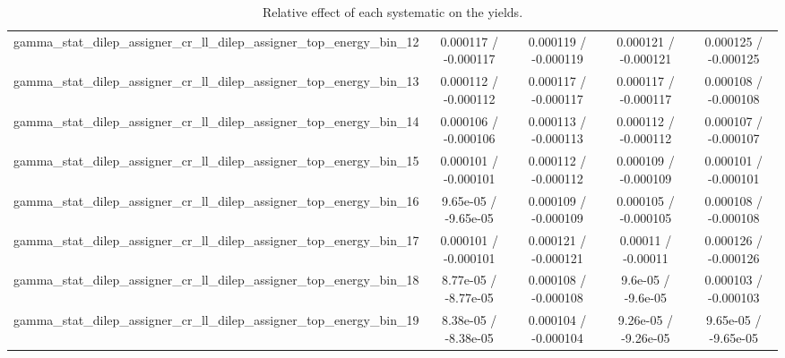 \documentclass[10pt]{article}
\begin{document}
\begin{table}[htbp]
\begin{center}
\begin{tabular}{|c|c|c|c|c|}
  gamma_stat_dilep_assigner_cr_ll_dilep_assigner_top_energy_bin_12 & 0.000117 / -0.000117 & 0.000119 / -0.000119 & 0.000121 / -0.000121 & 0.000125 / -0.000125 \\ 
  gamma_stat_dilep_assigner_cr_ll_dilep_assigner_top_energy_bin_13 & 0.000112 / -0.000112 & 0.000117 / -0.000117 & 0.000117 / -0.000117 & 0.000108 / -0.000108 \\ 
  gamma_stat_dilep_assigner_cr_ll_dilep_assigner_top_energy_bin_14 & 0.000106 / -0.000106 & 0.000113 / -0.000113 & 0.000112 / -0.000112 & 0.000107 / -0.000107 \\ 
  gamma_stat_dilep_assigner_cr_ll_dilep_assigner_top_energy_bin_15 & 0.000101 / -0.000101 & 0.000112 / -0.000112 & 0.000109 / -0.000109 & 0.000101 / -0.000101 \\ 
  gamma_stat_dilep_assigner_cr_ll_dilep_assigner_top_energy_bin_16 & 9.65e-05 / -9.65e-05 & 0.000109 / -0.000109 & 0.000105 / -0.000105 & 0.000108 / -0.000108 \\ 
  gamma_stat_dilep_assigner_cr_ll_dilep_assigner_top_energy_bin_17 & 0.000101 / -0.000101 & 0.000121 / -0.000121 & 0.00011 / -0.00011 & 0.000126 / -0.000126 \\ 
  gamma_stat_dilep_assigner_cr_ll_dilep_assigner_top_energy_bin_18 & 8.77e-05 / -8.77e-05 & 0.000108 / -0.000108 & 9.6e-05 / -9.6e-05 & 0.000103 / -0.000103 \\ 
  gamma_stat_dilep_assigner_cr_ll_dilep_assigner_top_energy_bin_19 & 8.38e-05 / -8.38e-05 & 0.000104 / -0.000104 & 9.26e-05 / -9.26e-05 & 9.65e-05 / -9.65e-05 \\ 
\hline 
\end{tabular} 
\caption{Relative effect of each systematic on the yields.} 
\end{center} 
\end{table} 
\end{document}
